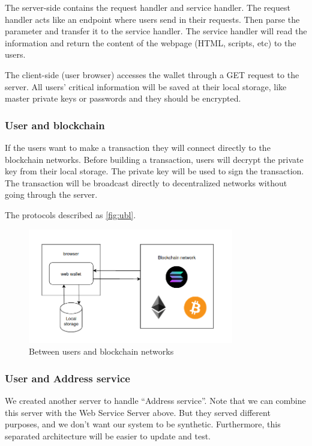 The server-side contains the request handler and service handler. The request handler acts like an endpoint where users send in their requests. Then parse the parameter and transfer it to the service handler. The service handler will read the information and return the content of the webpage (HTML, scripts, etc) to the users.

The client-side (user browser) accesses the wallet through a GET request to the server. All users' critical information will be saved at their local storage, like master private keys or passwords and they should be encrypted.

\subsubsection{User and blockchain}

If the users want to make a transaction they will connect directly to the blockchain networks. Before building a transaction, users will decrypt the private key from their local storage. The private key will be used to sign the transaction. The transaction will be broadcast directly to decentralized networks without going through the server.

The protocols described as \autoref{fig:ubl}.

\begin{figure}[!ht]
    \centering
    \includegraphics[width=0.8\textwidth]{images/design_ubl.png}
    \caption[Between users and blockchain networks]{Between users and blockchain networks}
    \label{fig:ubl}
\end{figure}

\subsubsection{User and Address service}

We created another server to handle “Address service”. Note that we can combine this server with the Web Service Server above. But they served different purposes, and we don’t want our system to be synthetic. Furthermore, this separated architecture will be easier to update and test.

